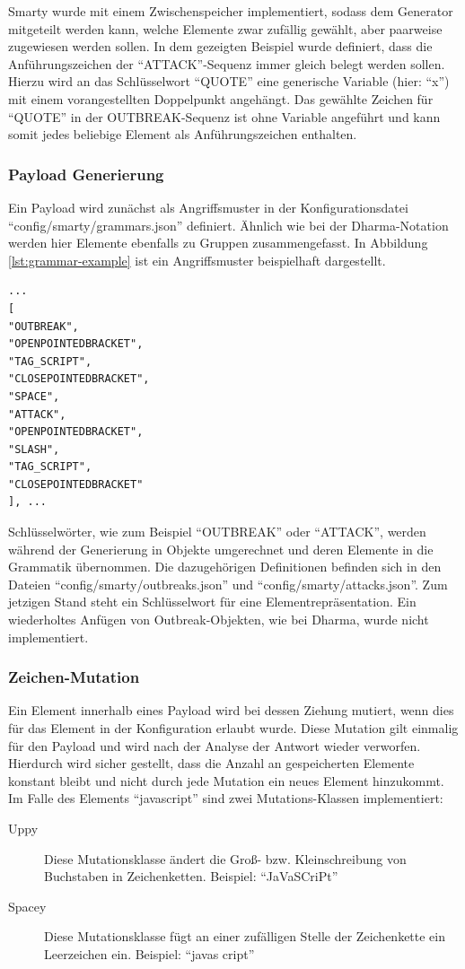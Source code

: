 \FloatBarrier
Smarty wurde mit einem Zwischenspeicher implementiert, sodass dem Generator mitgeteilt werden kann, welche Elemente zwar zufällig gewählt, aber paarweise zugewiesen werden sollen. In dem gezeigten Beispiel wurde definiert, dass die Anführungszeichen der ``ATTACK''-Sequenz immer gleich belegt werden sollen. Hierzu wird an das Schlüsselwort ``QUOTE'' eine generische Variable (hier: ``x'') mit einem vorangestellten Doppelpunkt angehängt. Das gewählte Zeichen für ``QUOTE'' in der OUTBREAK-Sequenz ist ohne Variable angeführt und kann somit jedes beliebige Element als Anführungszeichen enthalten.

\subsubsection{Payload Generierung}

Ein Payload wird zunächst als Angriffsmuster in der Konfigurationsdatei ``config/smarty/grammars.json'' definiert. Ähnlich wie bei der Dharma-Notation werden hier Elemente ebenfalls zu Gruppen zusammengefasst. In Abbildung \ref{lst:grammar-example} ist ein Angriffsmuster beispielhaft dargestellt. 

\begin{lstlisting}[caption={SmartGrazer: Auszug aus der Grammatik-Konfigurationsdatei},label=lst:grammar-example]
...
[
"OUTBREAK",
"OPENPOINTEDBRACKET",
"TAG_SCRIPT",
"CLOSEPOINTEDBRACKET",
"SPACE",
"ATTACK",
"OPENPOINTEDBRACKET",
"SLASH",
"TAG_SCRIPT",
"CLOSEPOINTEDBRACKET"
], ...
\end{lstlisting}

Schlüsselwörter, wie zum Beispiel ``OUTBREAK'' oder ``ATTACK'', werden während der Generierung in Objekte umgerechnet und deren Elemente in die Grammatik übernommen. Die dazugehörigen Definitionen befinden sich in den Dateien ``config/smarty/outbreaks.json'' und ``config/smarty/attacks.json''. Zum jetzigen Stand steht ein Schlüsselwort für eine Elementrepräsentation. Ein wiederholtes Anfügen von Outbreak-Objekten, wie bei Dharma, wurde nicht implementiert.

\subsubsection{Zeichen-Mutation}\label{ssec:payload-generation-mutation}

Ein Element innerhalb eines Payload wird bei dessen Ziehung mutiert, wenn dies für das Element in der Konfiguration erlaubt wurde. Diese Mutation gilt einmalig für den Payload und wird nach der Analyse der Antwort wieder verworfen. Hierdurch wird sicher gestellt, dass die Anzahl an gespeicherten Elemente konstant bleibt und nicht durch jede Mutation ein neues Element hinzukommt. Im Falle des Elements ``javascript'' sind zwei Mutations-Klassen implementiert:

\begin{description}
	\item[Uppy] Diese Mutationsklasse ändert die Groß- bzw. Kleinschreibung von Buchstaben in Zeichenketten. Beispiel: ``JaVaSCriPt''
	\item[Spacey] Diese Mutationsklasse fügt an einer zufälligen Stelle der Zeichenkette ein Leerzeichen ein. Beispiel: ``javas cript''
\end{description}
